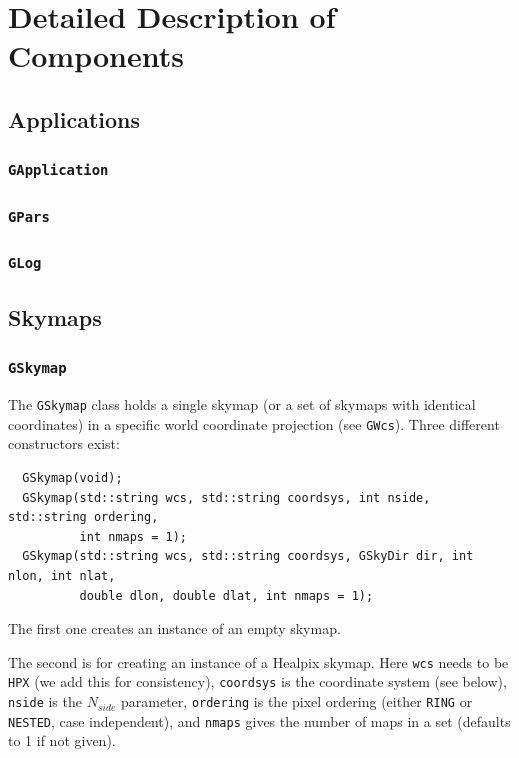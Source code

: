 \documentclass{article}[12pt,a4]
\begin{document}
\section{Detailed Description of Components}

\subsection{Applications}

\subsubsection{{\tt GApplication}}

\subsubsection{{\tt GPars}}

\subsubsection{{\tt GLog}}


\subsection{Skymaps}

\subsubsection{{\tt GSkymap}}

The {\tt GSkymap} class holds a single skymap (or a set of skymaps with identical coordinates)
in a specific world coordinate projection (see {\tt GWcs}).
Three different constructors exist:
\begin{verbatim}
  GSkymap(void);
  GSkymap(std::string wcs, std::string coordsys, int nside, std::string ordering,
          int nmaps = 1);
  GSkymap(std::string wcs, std::string coordsys, GSkyDir dir, int nlon, int nlat, 
          double dlon, double dlat, int nmaps = 1);
\end{verbatim}
The first one creates an instance of an empty skymap.

The second is for creating an instance of a Healpix skymap.
Here
{\tt wcs} needs to be {\tt HPX} (we add this for consistency),
{\tt coordsys} is the coordinate system (see below),
{\tt nside} is the $N_{side}$ parameter,
{\tt ordering} is the pixel ordering (either {\tt RING} or {\tt NESTED}, case independent),
and
{\tt nmaps} gives the number of maps in a set (defaults to 1 if not given).
\end{document}

